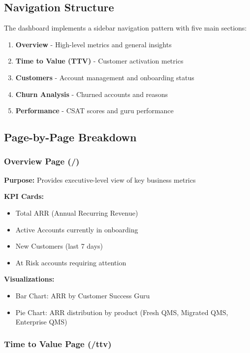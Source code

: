 \documentclass[12pt,a4paper]{article}
\begin{document}
\subsection{Navigation Structure}

The dashboard implements a sidebar navigation pattern with five main sections:

\begin{enumerate}
    \item \textbf{Overview} - High-level metrics and general insights
    \item \textbf{Time to Value (TTV)} - Customer activation metrics
    \item \textbf{Customers} - Account management and onboarding status
    \item \textbf{Churn Analysis} - Churned accounts and reasons
    \item \textbf{Performance} - CSAT scores and guru performance
\end{enumerate}

\subsection{Page-by-Page Breakdown}

\subsubsection{Overview Page (/)}

\textbf{Purpose:} Provides executive-level view of key business metrics

\textbf{KPI Cards:}
\begin{itemize}
    \item Total ARR (Annual Recurring Revenue)
    \item Active Accounts currently in onboarding
    \item New Customers (last 7 days)
    \item At Risk accounts requiring attention
\end{itemize}

\textbf{Visualizations:}
\begin{itemize}
    \item Bar Chart: ARR by Customer Success Guru
    \item Pie Chart: ARR distribution by product (Fresh QMS, Migrated QMS, Enterprise QMS)
\end{itemize}

\subsubsection{Time to Value Page (/ttv)}
\end{document}
